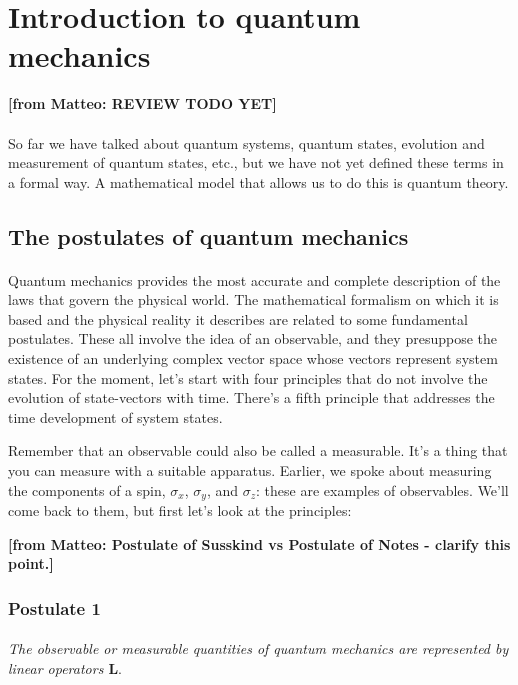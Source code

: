 \documentclass[a4paper,10pt]{article}
\newcommand{\from}[2]{{\bf[{\sc from #1:} #2]}}
\begin{document}
\newpage

\section{Introduction to quantum mechanics}

\from{Matteo}{REVIEW TODO YET}

\paragraph{} So far we have talked about quantum systems, quantum states, evolution and measurement of quantum states, etc., but we have not yet defined these terms in a formal way. A mathematical model that allows us to do this is quantum theory. 

\subsection{The postulates of quantum mechanics}

\paragraph{} Quantum mechanics provides the most accurate and complete description of the laws that govern the physical world. The mathematical formalism on which it is based and the physical reality it describes are related to some fundamental postulates. These all involve the idea of an observable, and they presuppose the existence of an underlying complex vector space whose vectors represent system states. For the moment, let's start with four principles that do not involve the evolution of state-vectors with time. There's a fifth principle that addresses the time development of system states.

Remember that an observable could also be called a measurable. It's a thing that you can measure with a suitable apparatus. Earlier, we spoke about measuring the components of a spin, $\sigma_x$, $\sigma_y$, and $\sigma_z$: these are examples of observables. We'll come back to them, but first let’s look at the principles:

\from{Matteo}{Postulate of Susskind vs Postulate of Notes - clarify this point.}

\subsubsection{Postulate 1}
\label{subsec:postulate1}
\paragraph{} \textit{The observable or measurable quantities of quantum mechanics are represented by linear operators $\mathbf{L}$}. 
\end{document}
